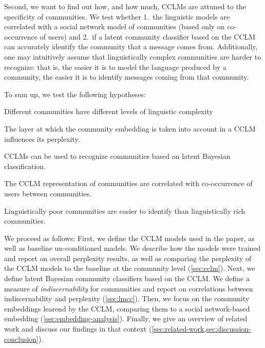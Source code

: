 \documentclass[11pt]{article}
\begin{document}
Second, we want to find out how, and how much, CCLMs are attuned to
the specificity of communities. We test whether 1.\ the linguistic
models are correlated with a social network model of communities (based only on
co-occurrence of users) and 2.\ if a latent community
classifier based on the CCLM can accurately identify the community that a
message comes from. Additionally, one may
intuitively assume that linguistically complex communities are harder to
recognize: that is, the easier it is to model the language produced by a community,
the easier it is to identify messages coming from that community.

To sum up, we test the following hypotheses:
\begin{hypotheses}
\item \label{hyp:varying-complexity} Different communities have different levels of linguistic
  complexity
\item \label{hyp:layer-effect} The layer at which the community embedding is taken into account
  in a CCLM influences its perplexity.
\item \label{hyp:LMCC-works} CCLMs can be used to recognize communities based on
  latent Bayesian classification.
\item \label{hyp:extra-linguistic-correlation} The CCLM representation of communities are correlated with
  co-occurrence of users between communities.
\item \label{hyp:rich-harder-to-identify} Linguistically poor communities are easier to identify than
  linguistically rich communities.
\end{hypotheses}

We proceed as follows: 
First, we define the CCLM models used in the paper, as well as baseline un-conditioned madels.
We describe how the models were trained and report on overall perplexity results, 
as well as comparing the perplexity of the CCLM models to the baseline at the community level
(\cref{sec:cclm}).
Next, we define latent Bayesian community classifiers based on the CCLM. We define a measure
of \emph{indiscernability} for communities and report on correlations between indiscernability and perplexity (\cref{sec:lmcc}).
Then, we focus on the community embeddings learend by the CCLM,
comparing them to a social network-based embedding (\cref{sec:embedding-analysis}).
Finally, we give an overview of related work and discuss our findings in that context (\cref{sec:related-work,sec:discussion-conclusion}).
\end{document}
